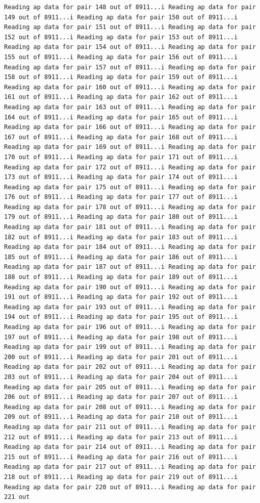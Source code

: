 \documentclass[
]{article}
\begin{document}
\begin{verbatim}
Reading ap data for pair 148 out of 8911...i Reading ap data for pair 149 out of 8911...i Reading ap data for pair 150 out of 8911...i Reading ap data for pair 151 out of 8911...i Reading ap data for pair 152 out of 8911...i Reading ap data for pair 153 out of 8911...i Reading ap data for pair 154 out of 8911...i Reading ap data for pair 155 out of 8911...i Reading ap data for pair 156 out of 8911...i Reading ap data for pair 157 out of 8911...i Reading ap data for pair 158 out of 8911...i Reading ap data for pair 159 out of 8911...i Reading ap data for pair 160 out of 8911...i Reading ap data for pair 161 out of 8911...i Reading ap data for pair 162 out of 8911...i Reading ap data for pair 163 out of 8911...i Reading ap data for pair 164 out of 8911...i Reading ap data for pair 165 out of 8911...i Reading ap data for pair 166 out of 8911...i Reading ap data for pair 167 out of 8911...i Reading ap data for pair 168 out of 8911...i Reading ap data for pair 169 out of 8911...i Reading ap data for pair 170 out of 8911...i Reading ap data for pair 171 out of 8911...i Reading ap data for pair 172 out of 8911...i Reading ap data for pair 173 out of 8911...i Reading ap data for pair 174 out of 8911...i Reading ap data for pair 175 out of 8911...i Reading ap data for pair 176 out of 8911...i Reading ap data for pair 177 out of 8911...i Reading ap data for pair 178 out of 8911...i Reading ap data for pair 179 out of 8911...i Reading ap data for pair 180 out of 8911...i Reading ap data for pair 181 out of 8911...i Reading ap data for pair 182 out of 8911...i Reading ap data for pair 183 out of 8911...i Reading ap data for pair 184 out of 8911...i Reading ap data for pair 185 out of 8911...i Reading ap data for pair 186 out of 8911...i Reading ap data for pair 187 out of 8911...i Reading ap data for pair 188 out of 8911...i Reading ap data for pair 189 out of 8911...i Reading ap data for pair 190 out of 8911...i Reading ap data for pair 191 out of 8911...i Reading ap data for pair 192 out of 8911...i Reading ap data for pair 193 out of 8911...i Reading ap data for pair 194 out of 8911...i Reading ap data for pair 195 out of 8911...i Reading ap data for pair 196 out of 8911...i Reading ap data for pair 197 out of 8911...i Reading ap data for pair 198 out of 8911...i Reading ap data for pair 199 out of 8911...i Reading ap data for pair 200 out of 8911...i Reading ap data for pair 201 out of 8911...i Reading ap data for pair 202 out of 8911...i Reading ap data for pair 203 out of 8911...i Reading ap data for pair 204 out of 8911...i Reading ap data for pair 205 out of 8911...i Reading ap data for pair 206 out of 8911...i Reading ap data for pair 207 out of 8911...i Reading ap data for pair 208 out of 8911...i Reading ap data for pair 209 out of 8911...i Reading ap data for pair 210 out of 8911...i Reading ap data for pair 211 out of 8911...i Reading ap data for pair 212 out of 8911...i Reading ap data for pair 213 out of 8911...i Reading ap data for pair 214 out of 8911...i Reading ap data for pair 215 out of 8911...i Reading ap data for pair 216 out of 8911...i Reading ap data for pair 217 out of 8911...i Reading ap data for pair 218 out of 8911...i Reading ap data for pair 219 out of 8911...i Reading ap data for pair 220 out of 8911...i Reading ap data for pair 221 out 
\end{verbatim}
\end{document}
